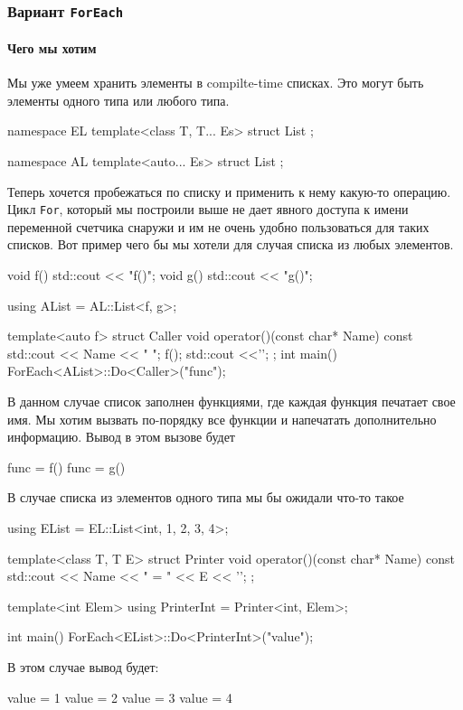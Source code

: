 \subsubsection{Вариант \texttt{ForEach}}

\paragraph{Чего мы хотим}

Мы уже умеем хранить элементы в compilte-time списках.
Это могут быть элементы одного типа или любого типа.
\begin{cppcode}
namespace EL {
template<class T, T... Es>
struct List {};
}

namespace AL {
template<auto... Es>
struct List {};
}
\end{cppcode}
Теперь хочется пробежаться по списку и применить к нему какую-то операцию.
Цикл \verb"For", который мы построили выше не дает явного доступа к имени переменной счетчика снаружи и им не очень удобно пользоваться для таких списков.
Вот пример чего бы мы хотели для случая списка из любых элементов.
\begin{cppcode}
void f() { std::cout << "f()"; }
void g() { std::cout << "g()"; }

using AList = AL::List<f, g>;

template<auto f>
struct Caller {
  void operator()(const char* Name) const {
    std::cout << Name << " ";
    f();
    std::cout <<'\n';
  }
};
int main() {
  ForEach<AList>::Do<Caller>("func");
}
\end{cppcode}
В данном случае список заполнен функциями, где каждая функция печатает свое имя.
Мы хотим вызвать по-порядку все функции и напечатать дополнительно информацию.
Вывод в этом вызове будет
\begin{cppcode}
func = f()
func = g()
\end{cppcode}
В случае списка из элементов одного типа мы бы ожидали что-то такое
\begin{cppcode}
using EList = EL::List<int, 1, 2, 3, 4>;

template<class T, T E>
struct Printer {
  void operator()(const char* Name) const {
    std::cout << Name << " = " << E << '\n';
  }
};

template<int Elem>
using PrinterInt = Printer<int, Elem>;

int main() {
  ForEach<EList>::Do<PrinterInt>("value");
}
\end{cppcode}
В этом случае вывод будет:
\begin{cppcode}
value = 1
value = 2
value = 3
value = 4
\end{cppcode}

